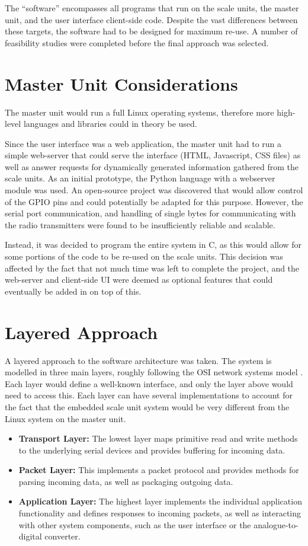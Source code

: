 The ``software'' encompasses all programs that run on the scale units, the master unit, and the user interface client-side code. Despite the vast differences between these targets, the software had to be designed for maximum re-use. A number of feasibility studies were completed before the final approach was selected.

\section{Master Unit Considerations}
The master unit would run a full Linux operating systems, therefore more high-level languages and libraries could in theory be used.

Since the user interface was a web application, the master unit had to run a simple web-server that could serve the interface (HTML, Javascript, CSS files) as well as answer requests for dynamically generated information gathered from the scale units. As an initial prototype, the Python language with a webserver module \cite{bottle-py} was used. An open-source project \cite{webiopi} was discovered that would allow control of the GPIO pins and could potentially be adapted for this purpose. However, the serial port communication, and handling of single bytes for communicating with the radio transmitters were found to be insufficiently reliable and scalable.

Instead, it was decided to program the entire system in C, as this would allow for some portions of the code to be re-used on the scale units. This decision was affected by the fact that not much time was left to complete the project, and the web-server and client-side UI were deemed as optional features that could eventually be added in on top of this.

\section{Layered Approach}
A layered approach to the software architecture was taken. The system is modelled in three main layers, roughly following the OSI network systems model \cite{osi-model}. Each layer would define a well-known interface, and only the layer above would need to access this. Each layer can have several implementations to account for the fact that the embedded scale unit system would be very different from the Linux system on the master unit.

\begin{itemize}
	\item \textbf{Transport Layer:} The lowest layer maps primitive read and write methods to the underlying serial devices and provides buffering for incoming data.
	\item \textbf{Packet Layer:} This implements a packet protocol and provides methods for parsing incoming data, as well as packaging outgoing data.
	\item \textbf{Application Layer:} The highest layer implements the individual application functionality and defines responses to incoming packets, as well as interacting with other system components, such as the user interface or the analogue-to-digital converter.
\end{itemize}

